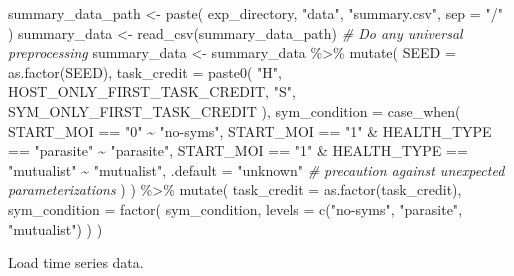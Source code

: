 \documentclass[
]{book}
\newenvironment{Shaded}{\begin{snugshade}}{\end{snugshade}}
\newcommand{\AttributeTok}[1]{\textcolor[rgb]{0.77,0.63,0.00}{#1}}
\newcommand{\CommentTok}[1]{\textcolor[rgb]{0.56,0.35,0.01}{\textit{#1}}}
\newcommand{\FunctionTok}[1]{\textcolor[rgb]{0.00,0.00,0.00}{#1}}
\newcommand{\NormalTok}[1]{#1}
\newcommand{\OtherTok}[1]{\textcolor[rgb]{0.56,0.35,0.01}{#1}}
\newcommand{\SpecialCharTok}[1]{\textcolor[rgb]{0.00,0.00,0.00}{#1}}
\newcommand{\StringTok}[1]{\textcolor[rgb]{0.31,0.60,0.02}{#1}}
\begin{document}
\begin{Shaded}
\begin{Highlighting}[]
\NormalTok{summary\_data\_path }\OtherTok{\textless{}{-}} \FunctionTok{paste}\NormalTok{(}
\NormalTok{  exp\_directory,}
  \StringTok{"data"}\NormalTok{,}
  \StringTok{"summary.csv"}\NormalTok{,}
  \AttributeTok{sep =} \StringTok{"/"}
\NormalTok{)}
\NormalTok{summary\_data }\OtherTok{\textless{}{-}} \FunctionTok{read\_csv}\NormalTok{(summary\_data\_path)}
\CommentTok{\# Do any universal preprocessing}
\NormalTok{summary\_data }\OtherTok{\textless{}{-}}\NormalTok{ summary\_data }\SpecialCharTok{\%\textgreater{}\%}
  \FunctionTok{mutate}\NormalTok{(}
    \AttributeTok{SEED =} \FunctionTok{as.factor}\NormalTok{(SEED),}
    \AttributeTok{task\_credit =} \FunctionTok{paste0}\NormalTok{(}
      \StringTok{"H"}\NormalTok{, HOST\_ONLY\_FIRST\_TASK\_CREDIT,}
      \StringTok{"S"}\NormalTok{, SYM\_ONLY\_FIRST\_TASK\_CREDIT}
\NormalTok{    ),}
    \AttributeTok{sym\_condition =} \FunctionTok{case\_when}\NormalTok{(}
\NormalTok{      START\_MOI }\SpecialCharTok{==} \StringTok{"0"} \SpecialCharTok{\textasciitilde{}} \StringTok{"no{-}syms"}\NormalTok{,}
\NormalTok{      START\_MOI }\SpecialCharTok{==} \StringTok{"1"} \SpecialCharTok{\&}\NormalTok{ HEALTH\_TYPE }\SpecialCharTok{==} \StringTok{"parasite"} \SpecialCharTok{\textasciitilde{}} \StringTok{"parasite"}\NormalTok{,}
\NormalTok{      START\_MOI }\SpecialCharTok{==} \StringTok{"1"} \SpecialCharTok{\&}\NormalTok{ HEALTH\_TYPE }\SpecialCharTok{==} \StringTok{"mutualist"} \SpecialCharTok{\textasciitilde{}} \StringTok{"mutualist"}\NormalTok{,}
      \AttributeTok{.default =} \StringTok{"unknown"} \CommentTok{\# precaution against unexpected parameterizations}
\NormalTok{    )}
\NormalTok{  ) }\SpecialCharTok{\%\textgreater{}\%}
  \FunctionTok{mutate}\NormalTok{(}
    \AttributeTok{task\_credit =} \FunctionTok{as.factor}\NormalTok{(task\_credit),}
    \AttributeTok{sym\_condition =} \FunctionTok{factor}\NormalTok{(}
\NormalTok{      sym\_condition,}
      \AttributeTok{levels =} \FunctionTok{c}\NormalTok{(}\StringTok{"no{-}syms"}\NormalTok{, }\StringTok{"parasite"}\NormalTok{, }\StringTok{"mutualist"}\NormalTok{)}
\NormalTok{    )}
\NormalTok{  )}
\end{Highlighting}
\end{Shaded}

Load time series data.
\end{document}
